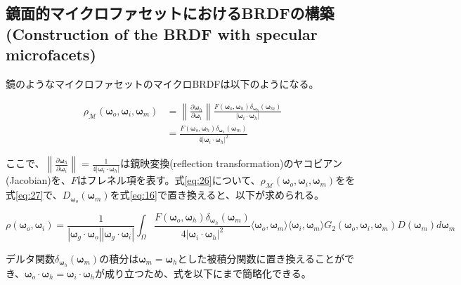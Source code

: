 \documentclass[a4j,xelatex,ja=standard]{bxjsarticle}
\begin{document}
\subsection{鏡面的マイクロファセットにおけるBRDFの構築(Construction of the BRDF with specular microfacets)}

鏡のようなマイクロファセットのマイクロBRDFは以下のようになる。

\begin{equation}
    \begin{split}
        \rho_{\mathcal M}(\boldsymbol{\omega}_o, \boldsymbol{\omega}_i, \boldsymbol{\omega}_m)
        &= \left\lVert \frac{\partial \boldsymbol{\omega}_h}{\partial \boldsymbol{\omega}_i} \right\rVert \frac{F(\boldsymbol{\omega}_o, \boldsymbol{\omega}_h) \delta_{\boldsymbol{\omega}_h}(\boldsymbol{\omega}_m)}{| \boldsymbol{\omega}_i \cdot \boldsymbol{\omega}_h |} \\
        &= \frac{F(\boldsymbol{\omega}_o, \boldsymbol{\omega}_h) \delta_{\boldsymbol{\omega}_h}(\boldsymbol{\omega}_m)}{4 | \boldsymbol{\omega}_i \cdot \boldsymbol{\omega}_h |^2}
    \end{split}
    \label{eq:27}
\end{equation}

ここで、$\left\lVert \frac{\partial \boldsymbol{\omega}_h}{\partial \boldsymbol{\omega}_i} \right\rVert = \frac{1}{4|\boldsymbol{\omega}_i \cdot \boldsymbol{\omega}_h|}$は鏡映変換(reflection transformation)のヤコビアン(Jacobian)を、$F$はフレネル項を表す。式\eqref{eq:26}について、$\rho_{\mathcal M}(\boldsymbol{\omega}_o, \boldsymbol{\omega}_i, \boldsymbol{\omega}_m)$をを式\eqref{eq:27}で、$D_{\boldsymbol{\omega}_o}(\boldsymbol{\omega}_m)$を式\eqref{eq:16}で置き換えると、以下が求められる。

\begin{equation}
    \rho(\boldsymbol{\omega}_o, \boldsymbol{\omega}_i) = \frac{1}{|\boldsymbol{\omega}_g \cdot \boldsymbol{\omega}_o| |\boldsymbol{\omega}_g \cdot \boldsymbol{\omega}_i|} \int_{\Omega} \frac{F(\boldsymbol{\omega}_o, \boldsymbol{\omega}_h)\delta_{\boldsymbol{\omega}_h}(\boldsymbol{\omega}_m)}{4|\boldsymbol{\omega}_i \cdot \boldsymbol{\omega}_h|^2} \langle \boldsymbol{\omega}_o, \boldsymbol{\omega}_m \rangle \langle \boldsymbol{\omega}_i, \boldsymbol{\omega}_m \rangle G_2(\boldsymbol{\omega}_o, \boldsymbol{\omega}_i, \boldsymbol{\omega}_m) D(\boldsymbol{\omega}_m) d\boldsymbol{\omega}_m
    \label{eq:28}
\end{equation}

デルタ関数$\delta_{\boldsymbol{\omega}_h}(\boldsymbol{\omega}_m)$の積分は$\boldsymbol{\omega}_m = \boldsymbol{\omega}_h$とした被積分関数に置き換えることができ、$\boldsymbol{\omega}_o \cdot \boldsymbol{\omega}_h = \boldsymbol{\omega}_i \cdot \boldsymbol{\omega}_h$が成り立つため、式を以下にまで簡略化できる。
\end{document}
